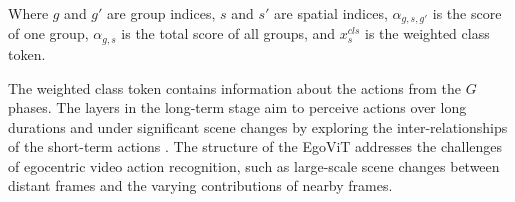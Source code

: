 Where $g$ and $g'$ are group indices, $s$ and $s'$ are spatial indices, $\alpha_{g,s,g'}$ is the score of one group, $\alpha_{g,s}$ is the total score of all groups, and $x^{cls}_s$ is the weighted class token.

The weighted class token contains information about the actions from the $G$ phases. The layers in the long-term stage aim to perceive actions over long durations and under significant scene changes by exploring the inter-relationships of the short-term actions \cite{pan_egovit_2023}. The structure of the EgoViT addresses the challenges of egocentric video action recognition, such as large-scale scene changes between distant frames and the varying contributions of nearby frames.



